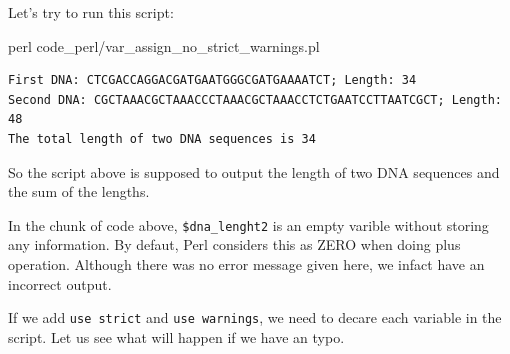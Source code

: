 \documentclass[]{book}
\makeatletter
\newenvironment{Shaded}{\begin{snugshade}}{\end{snugshade}}
\newcommand{\CharTok}[1]{\textcolor[rgb]{0.31,0.60,0.02}{#1}}
\newcommand{\CommentTok}[1]{\textcolor[rgb]{0.56,0.35,0.01}{\textit{#1}}}
\newcommand{\DataTypeTok}[1]{\textcolor[rgb]{0.13,0.29,0.53}{#1}}
\newcommand{\FunctionTok}[1]{\textcolor[rgb]{0.00,0.00,0.00}{#1}}
\newcommand{\KeywordTok}[1]{\textcolor[rgb]{0.13,0.29,0.53}{\textbf{#1}}}
\newcommand{\NormalTok}[1]{#1}
\newcommand{\StringTok}[1]{\textcolor[rgb]{0.31,0.60,0.02}{#1}}
\newenvironment{kframe}{%
\medskip{}
\setlength{\fboxsep}{.8em}
 \def\at@end@of@kframe{}%
 \ifinner\ifhmode%
  \def\at@end@of@kframe{\end{minipage}}%
  \begin{minipage}{\columnwidth}%
 \fi\fi%
 \def\FrameCommand##1{\hskip\@totalleftmargin \hskip-\fboxsep
 \colorbox{shadecolor}{##1}\hskip-\fboxsep
     \hskip-\linewidth \hskip-\@totalleftmargin \hskip\columnwidth}%
 \MakeFramed {\advance\hsize-\width
   \@totalleftmargin\z@ \linewidth\hsize
   \@setminipage}}%
 {\par\unskip\endMakeFramed%
 \at@end@of@kframe}
\renewenvironment{Shaded}{\begin{kframe}}{\end{kframe}}
\makeatother
\begin{document}
Let's try to run this script:

\begin{Shaded}
\begin{Highlighting}[]
\FunctionTok{perl}\NormalTok{ code_perl/var_assign_no_strict_warnings.pl}
\end{Highlighting}
\end{Shaded}

\begin{verbatim}
First DNA: CTCGACCAGGACGATGAATGGGCGATGAAAATCT; Length: 34
Second DNA: CGCTAAACGCTAAACCCTAAACGCTAAACCTCTGAATCCTTAATCGCT; Length: 48
The total length of two DNA sequences is 34 
\end{verbatim}

So the script above is supposed to output the length of two DNA sequences and the sum of the lengths.

In the chunk of code above, \texttt{\$dna\_lenght2} is an empty varible without storing any information. By defaut, Perl considers this as ZERO when doing plus operation. Although there was no error message given here, we infact have an incorrect output.

If we add \texttt{use\ strict} and \texttt{use\ warnings}, we need to decare each variable in the script. Let us see what will happen if we have an typo.

\begin{Shaded}
\end{Shaded}
\end{document}
